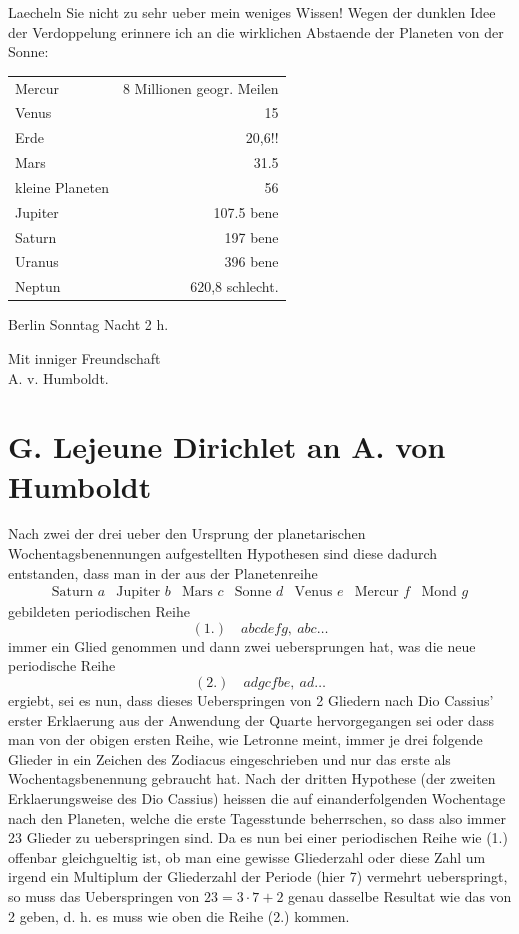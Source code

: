\documentclass[11pt]{article}
\newcommand{\sign}[1]{\begin{flushright}#1\end{flushright}}
\begin{document}
Laecheln Sie nicht zu sehr ueber mein weniges Wissen! Wegen der dunklen Idee der Verdoppelung erinnere ich an die wirklichen Abstaende der Planeten von der Sonne:

\begin{center}\small
\begin{tabular}{lr}
Mercur & 8 Millionen geogr. Meilen\\
Venus & 15\\
Erde & 20,6!!\\
Mars & 31.5\\
kleine Planeten & 56\\
Jupiter & 107.5 bene\\
Saturn & 197 bene\\
Uranus & 396 bene\\
Neptun & 620,8 schlecht.
\end{tabular}
\end{center}

Berlin Sonntag Nacht 2 h. \sign{Mit inniger Freundschaft\\ A. v. Humboldt.}

\section*{G. Lejeune Dirichlet an A. von Humboldt}
Nach zwei der drei ueber den Ursprung der planetarischen Wochentagsbenennungen aufgestellten Hypothesen sind diese dadurch entstanden, dass man in der aus der Planetenreihe
\[
\begin{array}{lllllll}
\text{Saturn }a & \text{Jupiter }b & \text{Mars }c & \text{Sonne }d & \text{Venus }e & \text{Mercur }f & \text{Mond }g
\end{array}
\]
gebildeten periodischen Reihe
\[
(1.)\quad abcdefg,\ abc\ldots
\]
immer ein Glied genommen und dann zwei uebersprungen hat, was die neue periodische Reihe
\[
(2.)\quad adgcfbe,\ ad\ldots
\]
ergiebt, sei es nun, dass dieses Ueberspringen von 2 Gliedern nach Dio Cassius' erster Erklaerung aus der Anwendung der Quarte hervorgegangen sei oder dass man von der obigen ersten Reihe, wie Letronne meint, immer je drei folgende Glieder in ein Zeichen des Zodiacus eingeschrieben und nur das erste als Wochentagsbenennung gebraucht hat. Nach der dritten Hypothese (der zweiten Erklaerungsweise des Dio Cassius) heissen die auf einanderfolgenden Wochentage nach den Planeten, welche die erste Tagesstunde beherrschen, so dass also immer 23 Glieder zu ueberspringen sind. Da es nun bei einer periodischen Reihe wie (1.) offenbar gleichgueltig ist, ob man eine gewisse Gliederzahl oder diese Zahl um irgend ein Multiplum der Gliederzahl der Periode (hier 7) vermehrt ueberspringt, so muss das Ueberspringen von \(23=3\cdot 7+2\) genau dasselbe Resultat wie das von 2 geben, d. h. es muss wie oben die Reihe (2.) kommen.
\end{document}

